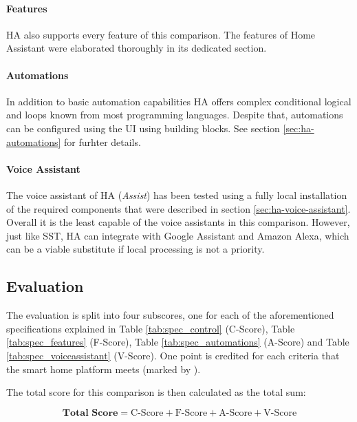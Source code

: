 \paragraph{Features}
HA also supports every feature of this comparison. The features of Home Assistant were elaborated thoroughly in its dedicated section.

\paragraph{Automations}
In addition to basic automation capabilities HA offers complex conditional logical and loops known from most programming languages. Despite that, automations can be configured using the UI using building blocks. See section \ref{sec:ha-automations} for furhter details. 

\paragraph{Voice Assistant}
The voice assistant of HA (\textit{Assist}) has been tested using a fully local installation of the required components that were described in section \ref{sec:ha-voice-assistant}. Overall it is the least capable of the voice assistants in this comparison. However, just like SST, HA can integrate with Google Assistant and Amazon Alexa, which can be a viable substitute if local processing is not a priority.

\newpage

\subsection{Evaluation}

The evaluation is split into four subscores, one for each of the aforementioned specifications explained in Table \ref{tab:spec_control} (C-Score), Table \ref{tab:spec_features} (F-Score), Table \ref{tab:spec_automations} (A-Score) and Table \ref{tab:spec_voiceassistant} (V-Score). One point is credited for each criteria that the smart home platform meets (marked by ).

The total score for this comparison is then calculated as the total sum:

$$
\textbf{Total Score} = \text{C-Score} + \text{F-Score} + \text{A-Score} + \text{V-Score}
$$

